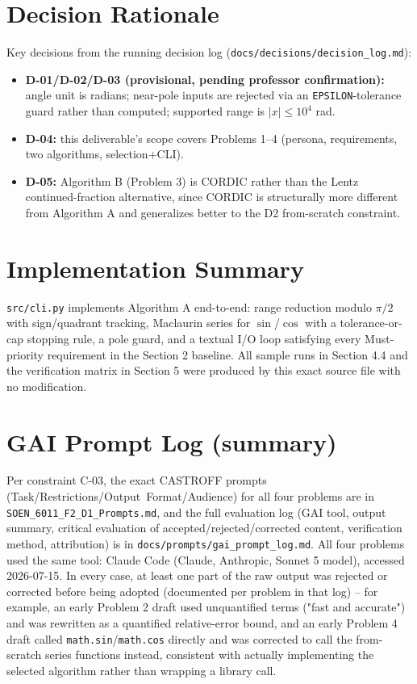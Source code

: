 \documentclass[11pt]{article}
\begin{document}
\section{Decision Rationale}
\label{sec:decisions}

Key decisions from the running decision log (\texttt{docs/decisions/decision\_log.md}):

\begin{itemize}
  \item \textbf{D-01/D-02/D-03 (provisional, pending professor confirmation):} angle unit is radians; near-pole inputs are rejected via an \texttt{EPSILON}-tolerance guard rather than computed; supported range is $|x|\le 10^4$ rad.
  \item \textbf{D-04:} this deliverable's scope covers Problems 1--4 (persona, requirements, two algorithms, selection+CLI).
  \item \textbf{D-05:} Algorithm B (Problem 3) is CORDIC rather than the Lentz continued-fraction alternative, since CORDIC is structurally more different from Algorithm A and generalizes better to the D2 from-scratch constraint.
\end{itemize}

\section{Implementation Summary}

\texttt{src/cli.py} implements Algorithm A end-to-end: range reduction modulo $\pi/2$ with sign/quadrant tracking, Maclaurin series for $\sin$/$\cos$ with a tolerance-or-cap stopping rule, a pole guard, and a textual I/O loop satisfying every Must-priority requirement in the Section 2 baseline. All sample runs in Section 4.4 and the verification matrix in Section 5 were produced by this exact source file with no modification.

\appendix
\section{GAI Prompt Log (summary)}
\label{sec:gai-log}

Per constraint C-03, the exact CASTROFF prompts (Task/Restrictions/Output~Format/Audience) for all four problems are in \texttt{SOEN\_6011\_F2\_D1\_Prompts.md}, and the full evaluation log (GAI tool, output summary, critical evaluation of accepted/rejected/corrected content, verification method, attribution) is in \texttt{docs/prompts/gai\_prompt\_log.md}. All four problems used the same tool: Claude Code (Claude, Anthropic, Sonnet 5 model), accessed 2026-07-15. In every case, at least one part of the raw output was rejected or corrected before being adopted (documented per problem in that log) -- for example, an early Problem 2 draft used unquantified terms ("fast and accurate") and was rewritten as a quantified relative-error bound, and an early Problem 4 draft called \texttt{math.sin}/\texttt{math.cos} directly and was corrected to call the from-scratch series functions instead, consistent with actually implementing the selected algorithm rather than wrapping a library call.
\end{document}
